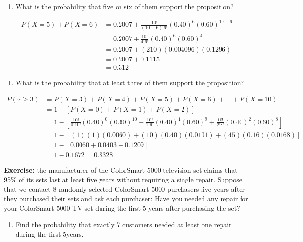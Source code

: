 \documentclass[
]{book}
\providecommand{\tightlist}{%
  \setlength{\itemsep}{0pt}\setlength{\parskip}{0pt}}
\begin{document}
\begin{enumerate}
\def\labelenumi{\arabic{enumi}.}
\setcounter{enumi}{1}
\tightlist
\item
  What is the probability that five or six of them support the proposition?
\end{enumerate}

\[
\begin{aligned}
P(X=5)+P(X=6)&=0.2007+\frac{10!}{(10-6)!6!}(0.40)^6(0.60)^{10-6} \\
&=0.2007+\frac{10!}{4!6!}(0.40)^6(0.60)^4 \\
&=0.2007+(210)(0.004096)(0.1296) \\
&=0.2007+0.1115 \\
&=0.312
\end{aligned}
\]

\begin{enumerate}
\def\labelenumi{\arabic{enumi}.}
\setcounter{enumi}{2}
\tightlist
\item
  What is the probability that at least three of them support the proposition?
\end{enumerate}

\[
\begin{aligned}
P(x \ge 3) &= P(X=3)+P(X=4)+P(X=5)+P(X=6)+...+P(X=10) \\
&=1-[P(X=0)+P(X=1)+P(X=2)] \\
&=1-[\frac{10!}{0!10!}(0.40)^0(0.60)^{10}+\frac{10!}{1!9!}(0.40)^1(0.60)^9+\frac{10!}{2!8!}(0.40)^2(0.60)^8] \\
&=1-[(1)(1)(0.0060)+(10)(0.40)(0.0101)+(45)(0.16)(0.0168)] \\
&=1-[0.0060+0.0403+0.1209] \\
&=1-0.1672 = 0.8328
\end{aligned}
\]

\textbf{Exercise:} the manufacturer of the ColorSmart-5000 television set claims that 95\% of
its sets last at least five years without requiring a single repair. Suppose that we contact 8 randomly selected ColorSmart-5000 purchasers five years after they purchased their sets and ask each purchaser: Have you needed any repair for your ColorSmart-5000 TV set during the first 5 years after purchasing the set?

\begin{enumerate}
\def\labelenumi{\arabic{enumi}.}
\tightlist
\item
  Find the probability that exactly 7 customers needed at least one repair during the first 5years.
\end{enumerate}
\end{document}
